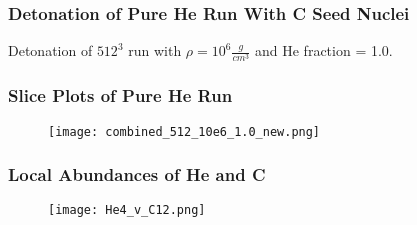 \documentclass{beamer}
\begin{document}


\begin{frame}
	
	\frametitle{Detonation of Pure He Run With C Seed Nuclei}
	\begin{center}
	\end{center}
	\begin{center} 
		Detonation of $512^{3}$ run with $\rho = 10^6 \frac{g}{cm^3}$ and He fraction = 1.0.
	\end{center}
\end{frame}



\begin{frame}
	\frametitle{Slice Plots of Pure He Run}

        \begin{figure}
    \begin{center}
      \texttt{[image: combined\_512\_10e6\_1.0\_new.png]}
    \end{center}
  \end{figure}


\end{frame}


\begin{frame}
        \frametitle{Local Abundances of He and C}

        \begin{figure}
    \begin{center}
      \texttt{[image: He4\_v\_C12.png]}
    \end{center}
  \end{figure}


\end{frame}
\end{document}
